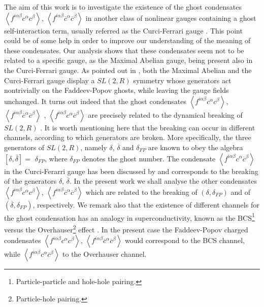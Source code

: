 \documentclass[a4paper,12pt]{article}
\begin{document}
The aim of this work is to investigate the existence of the ghost
condensates $\left\langle f^{i\alpha \beta }c^{\alpha }c^{\beta
}\right\rangle $, $\left\langle f^{i\alpha \beta }\overline{c}^{\alpha }%
\overline{c}^{\beta }\right\rangle $ in another class of nonlinear gauges 
\cite{dj} containing a ghost self-interaction term, usually referred as the
Curci-Ferrari gauge \cite{cf,ds,r}. This point could be of some help in
order to improve our understanding of the meaning of these condensates. Our
analysis shows that these condensates seem not to be related to a specific
gauge, as the Maximal Abelian gauge, being present also in the Curci-Ferrari
gauge. As pointed out in \cite{sl2r}, both the Maximal Abelian and the
Curci-Ferrari gauge display a $SL(2,R)$ symmetry whose generators act
nontrivially on the Faddeev-Popov ghosts, while leaving the gauge fields
unchanged. It turns out indeed that the ghost condensates $\left\langle
f^{i\alpha \beta }c^{\alpha }c^{\beta }\right\rangle $, $\left\langle
f^{i\alpha \beta }\overline{c}^{\alpha }\overline{c}^{\beta }\right\rangle $%
, $\left\langle f^{i\alpha \beta }c^{\alpha }\overline{c}^{\beta
}\right\rangle $ are precisely related to the dynamical breaking of $SL(2,R)$%
. It is worth mentioning here that the breaking can occur in different
channels, according to which generators are broken. More specifically, the
three generators of $SL(2,R)$, namely $\delta $, $\overline{\delta }$ and $%
\delta _{FP}\;$are known \cite{oj} to obey the algebra $\left[ \delta ,%
\overline{\delta }\right] =$ $\delta _{FP}$, where $\delta _{FP}$ denotes
the ghost number. The condensate $\left\langle f^{i\alpha \beta }c^{\alpha }%
\overline{c}^{\beta }\right\rangle $ in the Curci-Ferarri gauge has been
discussed by \cite{k1} and corresponds to the breaking of the generators $%
\delta $, $\overline{\delta }$. In the present work we shall analyse the
other condensates $\left\langle f^{i\alpha \beta }c^{\alpha }c^{\beta
}\right\rangle $, $\left\langle f^{i\alpha \beta }\overline{c}^{\alpha }%
\overline{c}^{\beta }\right\rangle $ which are related to the breaking of $%
\left( \delta ,\delta _{FP}\right) $ and of $\left( \overline{\delta }%
,\delta _{FP}\right) $, respectively. We remark also that the existence of
different channels for the ghost condensation has an analogy in
superconductivity, known as the BCS\footnote{%
Particle-particle and hole-hole pairing.} versus the Overhauser\footnote{%
Particle-hole pairing.} effect \cite{ov}. In the present case the
Faddeev-Popov charged condensates $\left\langle f^{i\alpha \beta }c^{\alpha
}c^{\beta }\right\rangle $, $\left\langle f^{i\alpha \beta }\overline{c}%
^{\alpha }\overline{c}^{\beta }\right\rangle $ would correspond to the BCS
channel, while $\left\langle f^{i\alpha \beta }c^{\alpha }\overline{c}%
^{\beta }\right\rangle $ to the Overhauser channel.
\end{document}
